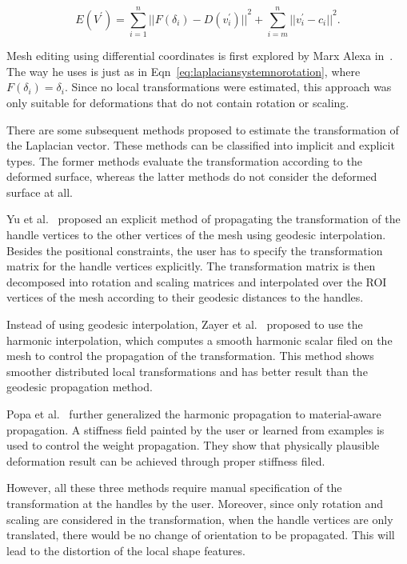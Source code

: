 \begin{equation}
\label{eq:laplaciansystem}
E(V^\prime)=\sum\limits_{i=1}^n {||F(\delta_i)-D(v_i^\prime)||}^2 +
\sum\limits_{i=m}^n {||v_i^\prime-c_i||}^2 .
\end{equation}

Mesh editing using differential coordinates is first explored by Marx Alexa in~\cite{AM01}. The way he uses is just as in Eqn~\ref{eq:laplaciansystemnorotation}, where $F(\delta_i) = \delta_i$. Since no local transformations were estimated, this approach was only suitable for deformations that do not contain rotation or scaling.

There are some subsequent methods proposed to estimate the transformation of the Laplacian vector. These methods can be classified into implicit and explicit types. The former methods evaluate the transformation according to the deformed surface, whereas the latter methods do not consider the deformed surface at all.

Yu et al.~\cite{YZXSBGS04} proposed an explicit method of propagating the transformation of the handle vertices to the other vertices of the mesh using geodesic interpolation. Besides the positional constraints, the user has to specify the transformation matrix for the handle vertices explicitly. The transformation matrix is then decomposed into rotation and scaling matrices and interpolated over the ROI vertices of the mesh according to their geodesic distances to the handles.

Instead of using geodesic interpolation, Zayer et al.~\cite{ZRKS05} proposed to use the harmonic interpolation, which computes a smooth harmonic scalar filed on the mesh to control the propagation of the transformation. This method shows smoother distributed local transformations and has better result than the geodesic propagation method.

Popa et al.~\cite{PJS05} further generalized the harmonic propagation to material-aware propagation. A stiffness field painted by the user or learned from examples is used to control the weight propagation. They show that physically plausible deformation result can be achieved through proper stiffness filed.

However, all these three methods require manual specification of the transformation at the handles by the user. Moreover, since only rotation and scaling are considered in the transformation, when the handle vertices are only translated, there would be no change of orientation to be propagated. This will lead to the distortion of the local shape features.

